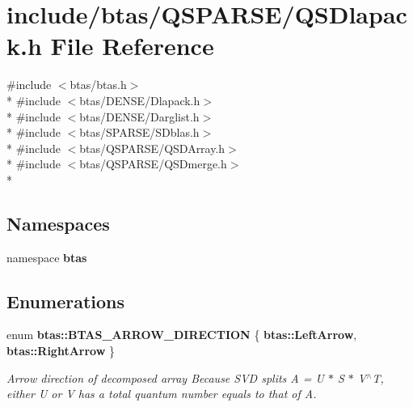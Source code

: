\section{include/btas/\-Q\-S\-P\-A\-R\-S\-E/\-Q\-S\-Dlapack.h File Reference}
\label{de/d28/QSDlapack_8h}
{\ttfamily \#include $<$btas/btas.\-h$>$}\\*
{\ttfamily \#include $<$btas/\-D\-E\-N\-S\-E/\-Dlapack.\-h$>$}\\*
{\ttfamily \#include $<$btas/\-D\-E\-N\-S\-E/\-Darglist.\-h$>$}\\*
{\ttfamily \#include $<$btas/\-S\-P\-A\-R\-S\-E/\-S\-Dblas.\-h$>$}\\*
{\ttfamily \#include $<$btas/\-Q\-S\-P\-A\-R\-S\-E/\-Q\-S\-D\-Array.\-h$>$}\\*
{\ttfamily \#include $<$btas/\-Q\-S\-P\-A\-R\-S\-E/\-Q\-S\-Dmerge.\-h$>$}\\*
\subsection*{Namespaces}
\begin{DoxyCompactItemize}
\item 
namespace {\bf btas}
\end{DoxyCompactItemize}
\subsection*{Enumerations}
\begin{DoxyCompactItemize}
\item 
enum {\bf btas\-::\-B\-T\-A\-S\-\_\-\-A\-R\-R\-O\-W\-\_\-\-D\-I\-R\-E\-C\-T\-I\-O\-N} \{ {\bf btas\-::\-Left\-Arrow}, 
{\bf btas\-::\-Right\-Arrow}
 \}
\begin{DoxyCompactList}\small\item\em Arrow direction of decomposed array Because S\-V\-D splits A = U $\ast$ S $\ast$ V$^\wedge$\-T, either U or V has a total quantum number equals to that of A. \end{DoxyCompactList}\end{DoxyCompactItemize}
